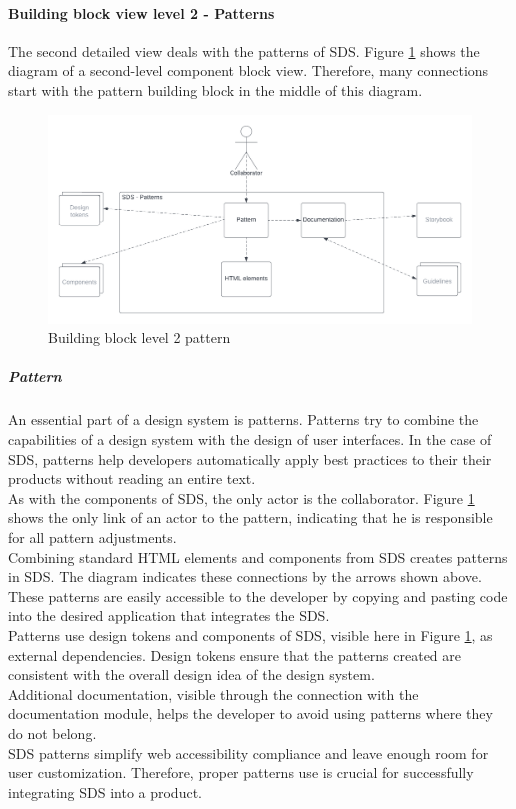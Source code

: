 \paragraph{Building block view level 2 - Patterns}
The second detailed view deals with the patterns of SDS. Figure \ref{building_block_level_2_pattern_sds} shows the diagram of a second-level component block view. Therefore, many connections start with the pattern building block in the middle of this diagram. 
\begin{figure}[htbp]
    \centerline{
    \includegraphics[width=\linewidth]{images/building_block_view_level_2_pattern.png}}
\caption{Building block level 2 pattern}
\label{building_block_level_2_pattern_sds}
\end{figure}



\subparagraph{Pattern}
An essential part of a design system is patterns. Patterns try to combine the capabilities of a design system with the design of user interfaces. In the case of \ac{SDS}, patterns help developers automatically apply best practices to their their products without reading an entire text. \\
As with the components of SDS, the only actor is the collaborator. Figure \ref{building_block_level_2_pattern_sds} shows the only link of an actor to the pattern, indicating that he is responsible for all pattern adjustments. \\
Combining standard \ac{HTML} elements and components from SDS creates patterns in SDS. The diagram indicates these connections by the arrows shown above. These patterns are easily accessible to the developer by copying and pasting code into the desired application that integrates the \ac{SDS}. \\
Patterns use design tokens and components of \ac{SDS}, visible here in Figure \ref{building_block_level_2_pattern_sds}, as external dependencies. Design tokens ensure that the patterns created are consistent with the overall design idea of the design system. \\
Additional documentation, visible through the connection with the documentation module, helps the developer to avoid using patterns where they do not belong. \\
SDS patterns simplify web accessibility compliance and leave enough room for user customization. Therefore, proper patterns use is crucial for successfully integrating \ac{SDS} into a product. 

